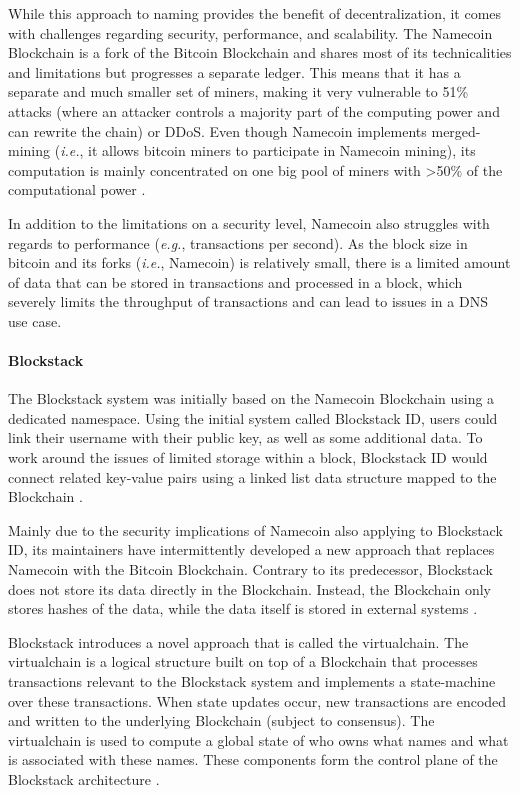 While this approach to naming provides the benefit of decentralization, it comes with challenges regarding security, performance, and scalability. The Namecoin Blockchain is a fork of the Bitcoin Blockchain and shares most of its technicalities and limitations but progresses a separate ledger. This means that it has a separate and much smaller set of miners, making it very vulnerable to 51\% attacks (where an attacker controls a majority part of the computing power and can rewrite the chain) or DDoS. Even though Namecoin implements merged-mining (\textit{i.e.}, it allows bitcoin miners to participate in Namecoin mining), its computation is mainly concentrated on one big pool of miners with >50\% of the computational power \cite{noauthor_namecoin_nodate, ali_blockstack:_2016}.

In addition to the limitations on a security level, Namecoin also struggles with regards to performance (\textit{e.g.}, transactions per second). As the block size in bitcoin and its forks (\textit{i.e.}, Namecoin) is relatively small, there is a limited amount of data that can be stored in transactions and processed in a block, which severely limits the throughput of transactions and can lead to issues in a DNS use case.

\paragraph{Blockstack}

The Blockstack system was initially based on the Namecoin Blockchain using a dedicated namespace. Using the initial system called Blockstack ID, users could link their username with their public key, as well as some additional data. To work around the issues of limited storage within a block, Blockstack ID would connect related key-value pairs using a linked list data structure mapped to the Blockchain \cite{ali_blockstack:_2016}.

Mainly due to the security implications of Namecoin also applying to Blockstack ID, its maintainers have intermittently developed a new approach that replaces Namecoin with the Bitcoin Blockchain. Contrary to its predecessor, Blockstack does not store its data directly in the Blockchain. Instead, the Blockchain only stores hashes of the data, while the data itself is stored in external systems \cite{ali_blockstack:_2016}.

Blockstack introduces a novel approach that is called the virtualchain. The virtualchain is a logical structure built on top of a Blockchain that processes transactions relevant to the Blockstack system and implements a state-machine over these transactions. When state updates occur, new transactions are encoded and written to the underlying Blockchain (subject to consensus). The virtualchain is used to compute a global state of who owns what names and what is associated with these names. These components form the control plane of the Blockstack architecture \cite{ali_blockstack:_2016}.

